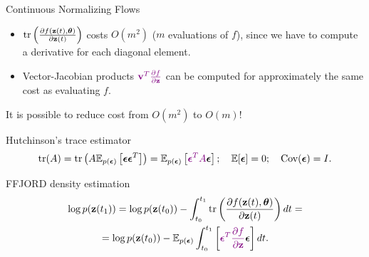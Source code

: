 \begin{frame}{Continuous Normalizing Flows}
	\vspace{0.2cm}
	\begin{itemize}
		\item $\text{tr} \left( \frac{\partial f(\mathbf{z}(t), \boldsymbol{\theta})}{\partial \mathbf{z}(t)} \right)$ costs $O(m^2)$ ($m$
		evaluations of $f$), since we have to compute a derivative for each diagonal element. 
		\item Vector-Jacobian products ${\color{violet}\mathbf{v}^T \frac{\partial f}{\partial \mathbf{z}}}$ can be computed for approximately the same cost as evaluating $f$.
	\end{itemize}
	It is possible to reduce cost from $O(m^2)$ to $O(m)$!
	\begin{block}{Hutchinson's trace estimator}
		\vspace{-0.3cm}
		\[
		    \text{tr}(A) = \text{tr}\left(A\mathbb{E}_{p(\boldsymbol{\epsilon})} \left[ \boldsymbol{\epsilon} \boldsymbol{\epsilon}^T \right]\right) = \mathbb{E}_{p(\boldsymbol{\epsilon})} \left[ {\color{violet} \boldsymbol{\epsilon}^T A} \boldsymbol{\epsilon}  \right]; \quad \mathbb{E} [\boldsymbol{\epsilon}] = 0; \quad \text{Cov} (\boldsymbol{\epsilon}) = I.
		\]
		\vspace{-0.5cm}
	\end{block}
	\begin{block}{FFJORD density estimation}
		\vspace{-0.8cm}
		\begin{multline*}
		    \log p(\mathbf{z}(t_1)) = \log p(\mathbf{z}(t_0)) - \int_{t_0}^{t_1} \text{tr}  \left( \frac{\partial f (\mathbf{z}(t), \boldsymbol{\theta})}{\partial \mathbf{z}(t)} \right) dt = \\ = \log p(\mathbf{z}(t_0)) - \mathbb{E}_{p(\boldsymbol{\epsilon})} \int_{t_0}^{t_1} \left[ {\color{violet}\boldsymbol{\epsilon}^T \frac{\partial f}{\partial \mathbf{z}}} \boldsymbol{\epsilon} \right] dt.
		\end{multline*}
	\end{block}
\end{frame}
